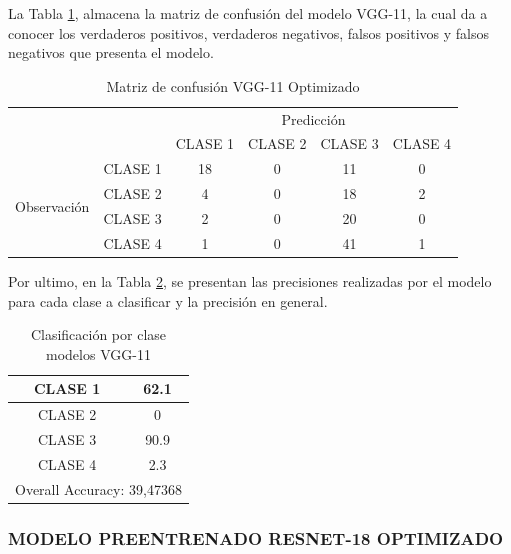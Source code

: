 \newpage
La Tabla \ref{tab:MC_VGG11_OPT}, almacena la matriz de confusión del modelo VGG-11, la cual da a conocer los verdaderos positivos, verdaderos negativos, falsos positivos y falsos negativos que presenta el modelo.
\begin{table}[htbp]
	\centering
	\begin{tabular}{|c|l|c|c|c|c|}
		\hline
		\multicolumn{2}{|c|}{\multirow{2}[4]{*}{}} & \multicolumn{4}{c|}{Predicción} \bigstrut\\
		\cline{3-6}    \multicolumn{2}{|c|}{} & CLASE 1 & CLASE 2 & CLASE 3 & CLASE 4 \bigstrut\\
		\hline
		\multirow{4}[8]{*}{\begin{sideways}Observación\end{sideways}} & CLASE 1 & 18     & 0     & 11    & 0 \bigstrut\\
		\cline{2-6}          & CLASE 2 & 4     & 0     & 18    & 2 \bigstrut\\
		\cline{2-6}          & CLASE 3 & 2     & 0     & 20    & 0 \bigstrut\\
		\cline{2-6}          & CLASE 4 & 1     & 0     & 41    & 1 \bigstrut\\
		\hline
	\end{tabular}%
	\caption{Matriz de confusión VGG-11 Optimizado }
	\label{tab:MC_VGG11_OPT}%
\end{table}%

Por ultimo, en la Tabla \ref{tab:VGG11optclases}, se presentan las precisiones realizadas por el modelo para cada clase a clasificar y la precisión en general.

\begin{table}[htbp]
	\centering
	\begin{tabular}{|c|c|}
		\hline
		CLASE 1 & 62.1 \bigstrut\\
		\hline
		CLASE 2 & 0 \bigstrut\\
		\hline
		CLASE 3 & 90.9 \bigstrut\\
		\hline
		CLASE 4 & 2.3 \bigstrut\\
		\hline
		\multicolumn{2}{|c|}{Overall Accuracy: 39,47368} \bigstrut\\
		\hline
	\end{tabular}%
	\caption{Clasificación por clase modelos VGG-11}
	\label{tab:VGG11optclases}%
\end{table}%

\newpage	
\subsubsection{\MakeUppercase{Modelo Preentrenado ResNet-18 Optimizado}}

